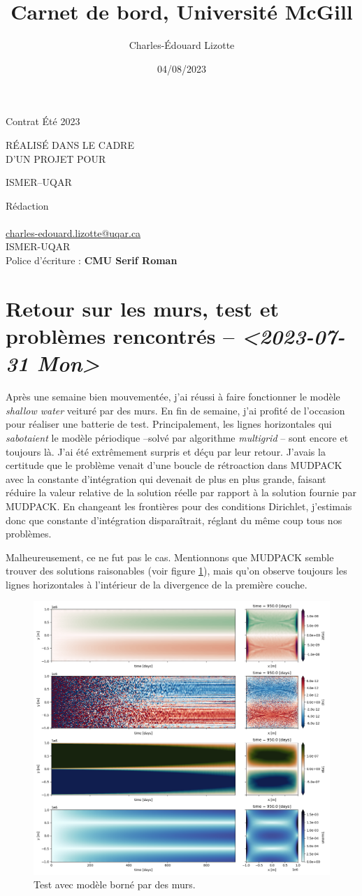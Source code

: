 \documentclass[10pt]{report}
\author{Charles-Édouard Lizotte}
\date{04/08/2023}
\title{Carnet de bord, Université McGill}
\makeatletter
\numberwithin{equation}{section}
\newcommand{\mytitlepage}{
\begin{titlepage}
\begin{center}
{\Huge Contrat Été 2023 \par}
\vspace{2cm}
{\Huge \MakeUppercase{\thetitle} \par}
\vspace{2cm}
RÉALISÉ DANS LE CADRE\\ D'UN PROJET POUR \par
\vspace{2cm}
{\Huge ISMER--UQAR \par}
\vspace{2cm}
{\thedate}
\end{center}
\vfill
Rédaction \\
{\theauthor}\\
\url{charles-edouard.lizotte@uqar.ca}\\
ISMER-UQAR\\
Police d'écriture : \textbf{CMU Serif Roman}
\end{titlepage}
}
\makeatother
\begin{document}
\mytitlepage
\tableofcontents\newpage


\section{Retour sur les murs, test et problèmes rencontrés -- \textit{<2023-07-31 Mon>}}
\label{sec:org9e9b384}

Après une semaine bien mouvementée, j'ai réussi à faire fonctionner le modèle \emph{shallow water} veituré par des murs.
En fin de semaine, j'ai profité de l'occasion pour réaliser une batterie de test.
Principalement, les lignes horizontales qui \emph{sabotaient} le modèle périodique --solvé par algorithme \emph{multigrid} -- sont encore et toujours là.
J'ai été extrêmement surpris et déçu par leur retour.
J'avais la certitude que le problème venait d'une boucle de rétroaction dans MUDPACK avec la constante d'intégration qui devenait de plus en plus grande, faisant réduire la valeur relative de la solution réelle par rapport à la solution fournie par MUDPACK.
En changeant les frontières pour des conditions Dirichlet, j'estimais donc que constante d'intégration disparaîtrait, réglant du même coup tous nos problèmes.\bigskip

Malheureusement, ce ne fut pas le cas.
Mentionnons que MUDPACK semble trouver des solutions raisonables (voir figure \ref{fig:org6f1143f}), mais qu'on observe toujours les lignes horizontales à l'intérieur de la divergence de la première couche.

\begin{figure}[htbp]
\centering
\includegraphics[width=.9\linewidth]{figures/tests/2023-07-31_hovmoller1_t=950days.png}
\caption{\label{fig:org6f1143f}Test avec modèle borné par des murs.}
\end{figure}
\newpage
\end{document}
